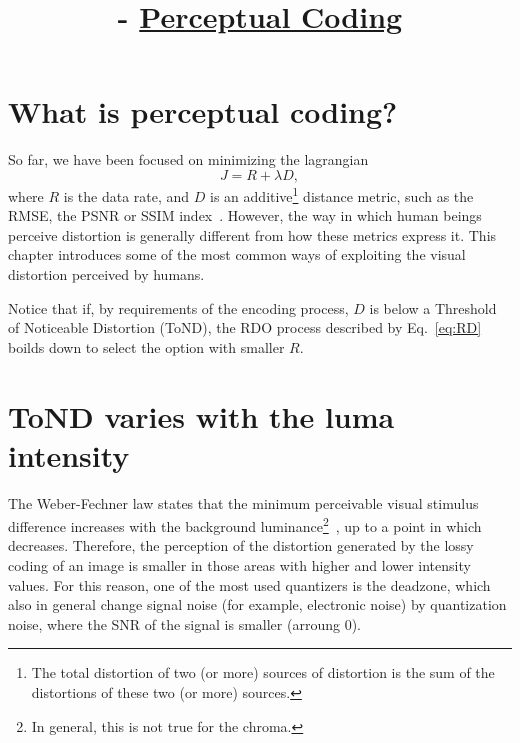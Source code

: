 

\title{\SM{} - \href{https://github.com/Sistemas-Multimedia/Sistemas-Multimedia.github.io/tree/master/contents/perceptual_coding}{Perceptual Coding}}

\maketitle
\tableofcontents

\section{What is perceptual coding?}

So far, we have been focused on minimizing the
lagrangian~\cite{sullivan1998rate}
\begin{equation}
  J = R + \lambda D,
  \label{eq:RD}
\end{equation}
where $R$ is the data rate, and $D$ is an additive\footnote{The total
distortion of two (or more) sources of distortion is the sum of the
distortions of these two (or more) sources.} distance metric, such as
the RMSE, the PSNR or SSIM index~\cite{wang2004image}. However, the
way in which human beings perceive distortion is generally different
from how these metrics express it. This chapter introduces some of the
most common ways of exploiting the visual distortion perceived by
humans.

Notice that if, by requirements of the encoding process, $D$ is below
a Threshold of Noticeable Distortion (ToND), the RDO process described
by Eq.~\ref{eq:RD} boilds down to select the option with smaller $R$.

\section{ToND varies with the luma intensity}

The Weber-Fechner law states that the minimum perceivable visual
stimulus difference increases with the background
luminance\footnote{In general, this is not true for the
chroma.}~\cite{naccari2014perceptually}, up to a point in which
decreases. Therefore, the perception of the distortion generated by
the lossy coding of an image is smaller in those areas with higher and
lower intensity values. For this reason, one of the most used
quantizers is the deadzone, which also in general change signal noise
(for example, electronic noise) by quantization noise, where the SNR
of the signal is smaller (arroung 0).

